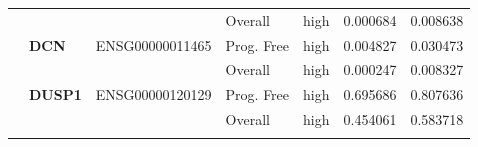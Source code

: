 \begin{spacing}{1}
{\begin{longtable}{|>{\bfseries}p{2cm}|>{\bfseries}p{1.9cm}|p{2.8cm}|p{2cm}|p{2cm}|p{1.5cm}|p{1.5cm}|}
            \hhline{~~~----}
             &          &                 & Overall    & high & 0.000684 & 0.008638                \\
            \hhline{~======}
             & DCN      & ENSG00000011465 & Prog. Free & high & 0.004827 & 0.030473                \\
            \hhline{~~~----}
             &          &                 & Overall    & high & 0.000247 & 0.008327                \\
            \hhline{~======}
             & DUSP1    & ENSG00000120129 & Prog. Free & high & 0.695686 & 0.807636                \\
            \hhline{~~~----}
             &          &                 & Overall    & high & 0.454061 & 0.583718                \\
            \hhline{~======}


\end{longtable}}
\end{spacing}

